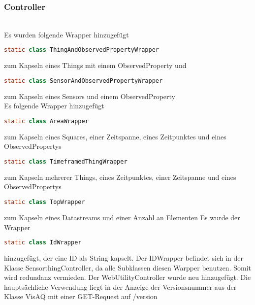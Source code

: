 \subsubsection{Controller}
\noChange
{}
\noChange
{}
\noChange
{}
\noChange
{}
\noChange
{}
\noChange
{}
\noChange
\controllerWrapper
\\
Es wurden folgende Wrapper hinzugefügt
\begin{lstlisting}[language=java]
    static class ThingAndObservedPropertyWrapper
\end{lstlisting}
zum Kapseln eines Things mit einem ObservedProperty
und 
\begin{lstlisting}[language=java]
    static class SensorAndObservedPropertyWrapper
\end{lstlisting}
zum Kapseln eines Sensors und einem ObservedProperty
\controllerWrapper
{}
\controllerWrapper
{}
\controllerWrapper
{}
\controllerWrapper
\\
Es folgende Wrapper hinzugefügt
\begin{lstlisting}[language=java]
    static class AreaWrapper
\end{lstlisting}
zum Kapseln eines Squares, einer Zeitspanne, eines Zeitpunktes und eines ObservedPropertys
\begin{lstlisting}[language=java]
    static class TimeframedThingWrapper
\end{lstlisting}
zum Kapseln mehrerer Things, eines Zeitpunktes, einer Zeitspanne und eines ObservedPropertys
\begin{lstlisting}[language=java]
    static class TopWrapper
\end{lstlisting}
zum Kapseln eines Datastreams und einer Anzahl an Elementen
\controllerWrapper
{}
\controllerWrapper
{}
Es wurde der Wrapper
\begin{lstlisting}[language=java]
    static class IdWrapper
\end{lstlisting}
hinzugefügt, der eine ID als String kapselt.
Der IDWrapper befindet sich in der Klasse SensorthingController, da alle Subklassen diesen Warpper benutzen.
Somit wird redundanz vermieden.
\controllerWrapper
{}
\controllerWrapper
{}
Der WebUtilityController wurde neu hinzugefügt. Die hauptsächliche Verwendung liegt in der Anzeige der Versionsnummer aus der Klasse VisAQ mit einer GET-Request auf /version


